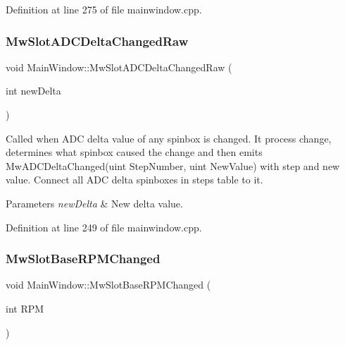 Definition at line 275 of file mainwindow.\+cpp.

\mbox{\label{class_main_window_acbdfd3592779f6946c4fecc33c79e9a4}} 
\subsubsection{\texorpdfstring{Mw\+Slot\+A\+D\+C\+Delta\+Changed\+Raw}{MwSlotADCDeltaChangedRaw}}
{\footnotesize\ttfamily void Main\+Window\+::\+Mw\+Slot\+A\+D\+C\+Delta\+Changed\+Raw (\begin{DoxyParamCaption}\item[{int}]{new\+Delta }\end{DoxyParamCaption})\hspace{0.3cm}{\ttfamily [slot]}}



Called when A\+DC delta value of any spinbox is changed. It process change, determines what spinbox caused the change and then emits Mw\+A\+D\+C\+Delta\+Changed(uint Step\+Number, uint New\+Value) with step and new value. Connect all A\+DC delta spinboxes in steps table to it. 


\begin{DoxyParams}{Parameters}
{\em new\+Delta} & New delta value. \\
\hline
\end{DoxyParams}


Definition at line 249 of file mainwindow.\+cpp.

\mbox{\label{class_main_window_aaf5b44955c0c93824ea89edd3cdc5730}} 
\subsubsection{\texorpdfstring{Mw\+Slot\+Base\+R\+P\+M\+Changed}{MwSlotBaseRPMChanged}}
{\footnotesize\ttfamily void Main\+Window\+::\+Mw\+Slot\+Base\+R\+P\+M\+Changed (\begin{DoxyParamCaption}\item[{int}]{R\+PM }\end{DoxyParamCaption})\hspace{0.3cm}{\ttfamily [slot]}}




